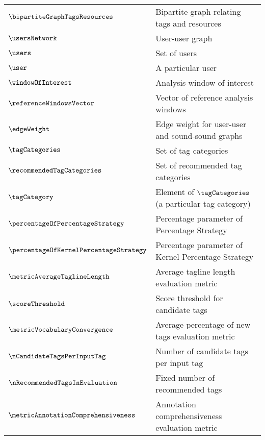 \begin{longtable}{p{1.4cm}p{11.1cm}}
\\ $\bipartiteGraphTagsResources$                   & Bipartite graph relating tags and resources
\\ $\usersNetwork$                                  & User-user graph
\\ $\users$                                         & Set of users 
\\ $\user$                                          & A particular user
\\ $\windowOfInterest$                              & Analysis window of interest
\\ $\referenceWindowsVector$                        & Vector of reference analysis windows
\\ $\edgeWeight$                                    & Edge weight for user-user and sound-sound graphs
\\ $\tagCategories$									& Set of tag categories
\\ $\recommendedTagCategories$						& Set of recommended tag categories
\\ $\tagCategory$									& Element of $\tagCategories$ (a particular tag category)
\\ $\percentageOfPercentageStrategy$                & Percentage parameter of Percentage Strategy
\\ $\percentageOfKernelPercentageStrategy$          & Percentage parameter of Kernel Percentage Strategy
\\ $\metricAverageTaglineLength$                    & Average tagline length evaluation metric
\\ $\scoreThreshold$                                & Score threshold for candidate tags
\\ $\metricVocabularyConvergence$                   & Average percentage of new tags evaluation metric
\\ $\nCandidateTagsPerInputTag$                     & Number of candidate tags per input tag
\\ $\nRecommendedTagsInEvaluation$                  & Fixed number of recommended tags
\\ $\metricAnnotationComprehensiveness$				& Annotation comprehensiveness evaluation metric

\end{longtable}
